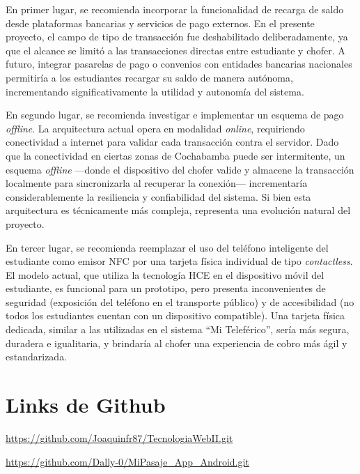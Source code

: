 \documentclass[12pt,letterpaper]{report}
\begin{document}
	En primer lugar, se recomienda incorporar la funcionalidad de recarga de saldo desde plataformas bancarias y servicios de pago externos. En el presente proyecto, el campo de tipo de transacción fue deshabilitado deliberadamente, ya que el alcance se limitó a las transacciones directas entre estudiante y chofer. A futuro, integrar pasarelas de pago o convenios con entidades bancarias nacionales permitiría a los estudiantes recargar su saldo de manera autónoma, incrementando significativamente la utilidad y autonomía del sistema.
	
	En segundo lugar, se recomienda investigar e implementar un esquema de pago \textit{offline}. La arquitectura actual opera en modalidad \textit{online}, requiriendo conectividad a internet para validar cada transacción contra el servidor. Dado que la conectividad en ciertas zonas de Cochabamba puede ser intermitente, un esquema \textit{offline} ---donde el dispositivo del chofer valide y almacene la transacción localmente para sincronizarla al recuperar la conexión--- incrementaría considerablemente la resiliencia y confiabilidad del sistema. Si bien esta arquitectura es técnicamente más compleja, representa una evolución natural del proyecto.
	
	En tercer lugar, se recomienda reemplazar el uso del teléfono inteligente del estudiante como emisor NFC por una tarjeta física individual de tipo \textit{contactless}. El modelo actual, que utiliza la tecnología HCE en el dispositivo móvil del estudiante, es funcional para un prototipo, pero presenta inconvenientes de seguridad (exposición del teléfono en el transporte público) y de accesibilidad (no todos los estudiantes cuentan con un dispositivo compatible). Una tarjeta física dedicada, similar a las utilizadas en el sistema ``Mi Teleférico'', sería más segura, duradera e igualitaria, y brindaría al chofer una experiencia de cobro más ágil y estandarizada.
	
	
	
	\renewcommand\bibname{Referencias}
	\section{Links de Github}
	
	
	
	\url{https://github.com/Joaquinfr87/TecnologiaWebII.git}
	
	\url{https://github.com/Dally-0/MiPasaje_App_Android.git}
	
	
	
\end{document}
